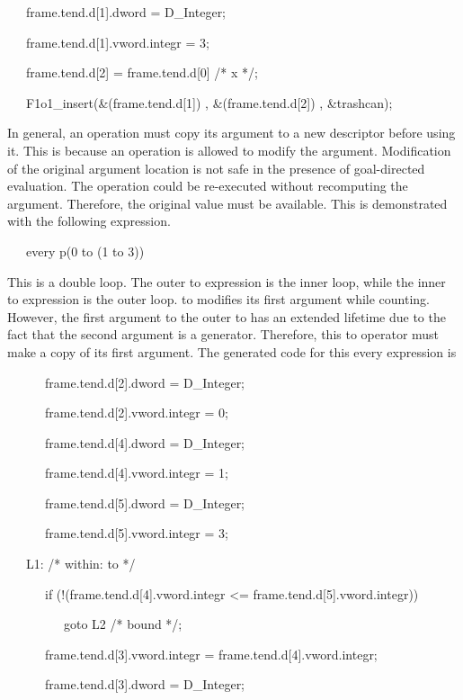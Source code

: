 {\ttfamily\mdseries
\ \ \ frame.tend.d[1].dword = D\_Integer;}

{\ttfamily\mdseries
\ \ \ frame.tend.d[1].vword.integr = 3;}

{\ttfamily\mdseries
\ \ \ frame.tend.d[2] = frame.tend.d[0] /* x */;}

{\ttfamily\mdseries
\ \ \ F1o1\_insert(\&(frame.tend.d[1]) , \&(frame.tend.d[2]) , \&trashcan);}


In general, an operation must copy its argument to a new descriptor
before using it. This is because an operation is allowed to modify the
argument. Modification of the original argument location is not safe
in the presence of goal-directed evaluation. The operation could be
re-executed without recomputing the argument. Therefore, the original
value must be available. This is demonstrated with the following
expression.

{\ttfamily\mdseries
\ \ \ every p(0 to (1 to 3))}


This is a double loop. The outer to expression is the inner loop,
while the inner to expression is the outer loop. to modifies its first
argument while counting. However, the first argument to the outer to
has an extended lifetime due to the fact that the second argument is a
generator. Therefore, this to operator must make a copy of its first
argument.  The generated code for this every expression is

{\ttfamily\mdseries
\ \ \ \ \ \ frame.tend.d[2].dword = D\_Integer;}

{\ttfamily\mdseries
\ \ \ \ \ \ frame.tend.d[2].vword.integr = 0;}

{\ttfamily\mdseries
\ \ \ \ \ \ frame.tend.d[4].dword = D\_Integer;}

{\ttfamily\mdseries
\ \ \ \ \ \ frame.tend.d[4].vword.integr = 1;}

{\ttfamily\mdseries
\ \ \ \ \ \ frame.tend.d[5].dword = D\_Integer;}

{\ttfamily\mdseries
\ \ \ \ \ \ frame.tend.d[5].vword.integr = 3;}

{\ttfamily\mdseries
\ \ \ L1: /* within: to */}

{\ttfamily\mdseries
\ \ \ \ \ \ if (!(frame.tend.d[4].vword.integr {\textless}= frame.tend.d[5].vword.integr))}

{\ttfamily\mdseries
\ \ \ \ \ \ \ \ \ goto L2 /* bound */;}

{\ttfamily\mdseries
\ \ \ \ \ \ frame.tend.d[3].vword.integr = frame.tend.d[4].vword.integr;}

{\ttfamily\mdseries
\ \ \ \ \ \ frame.tend.d[3].dword = D\_Integer;}

